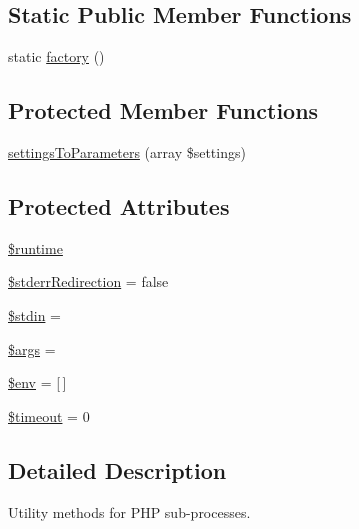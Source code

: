 \subsection*{Static Public Member Functions}
\begin{DoxyCompactItemize}
\item 
static \mbox{\hyperlink{class_p_h_p_unit___util___p_h_p_a6ccd25adce4691ef9e9b6feabc94a892}{factory}} ()
\end{DoxyCompactItemize}
\subsection*{Protected Member Functions}
\begin{DoxyCompactItemize}
\item 
\mbox{\hyperlink{class_p_h_p_unit___util___p_h_p_ae3411690a9e6580097926e3d0b2a10e5}{settings\+To\+Parameters}} (array \$settings)
\end{DoxyCompactItemize}
\subsection*{Protected Attributes}
\begin{DoxyCompactItemize}
\item 
\mbox{\hyperlink{class_p_h_p_unit___util___p_h_p_a848d6f39ddf52949fc0c10cbc0159188}{\$runtime}}
\item 
\mbox{\hyperlink{class_p_h_p_unit___util___p_h_p_a7309a2a96c1122be71fd81873d93e678}{\$stderr\+Redirection}} = false
\item 
\mbox{\hyperlink{class_p_h_p_unit___util___p_h_p_a1ff25669b0b979247f2493d3e46b2649}{\$stdin}} = \textquotesingle{}\textquotesingle{}
\item 
\mbox{\hyperlink{class_p_h_p_unit___util___p_h_p_a67e94494731d99ed23b123e95175bc10}{\$args}} = \textquotesingle{}\textquotesingle{}
\item 
\mbox{\hyperlink{class_p_h_p_unit___util___p_h_p_aa99ce9ae015e958eef5782267276fbb4}{\$env}} = \mbox{[}$\,$\mbox{]}
\item 
\mbox{\hyperlink{class_p_h_p_unit___util___p_h_p_a84320a9bf3e591d7ae20dfcb0dfe6a0d}{\$timeout}} = 0
\end{DoxyCompactItemize}


\subsection{Detailed Description}
Utility methods for P\+HP sub-\/processes. 

